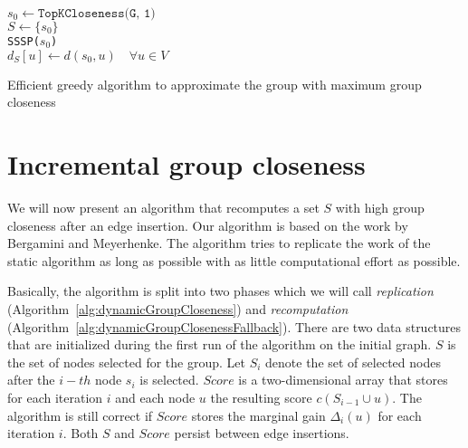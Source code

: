 \begin{algorithm2e}[h!]
  \label{alg:bergaminiGroupCloseness}
 
  $s_0 \gets \texttt{TopKCloseness(G, 1)}$ \label{alg:gcTopKCloseness} \\
  $S \gets \{s_0\}$ \\
  \texttt{SSSP($s_0$)} \\
  $d_S[u] \gets d(s_0, u) \quad \forall u \in V$ \\
  
 
  \caption{Efficient greedy algorithm to approximate the group with maximum group closeness}
\end{algorithm2e}


\section{Incremental group closeness}
We will now present an algorithm that recomputes a set $S$ with high group closeness after an edge insertion. Our algorithm is based on the work by Bergamini and Meyerhenke. The algorithm tries to replicate the work of the static algorithm as long as possible with as little computational effort as possible.

Basically, the algorithm is split into two phases which we will call \emph{replication} (Algorithm~\ref{alg:dynamicGroupCloseness}) and \emph{recomputation} (Algorithm~\ref{alg:dynamicGroupClosenessFallback}). There are two data structures that are initialized during the first run of the algorithm on the initial graph. $S$ is the set of nodes selected for the group. Let $S_i$ denote the set of selected nodes after the $i-th$ node $s_i$ is selected. $Score$ is a two-dimensional array that stores for each iteration $i$ and each node $u$ the resulting score $c(S_{i - 1} \cup u)$. The algorithm is still correct if $Score$ stores the marginal gain $\Delta_i(u)$ for each iteration $i$. Both $S$ and $Score$ persist between edge insertions.

